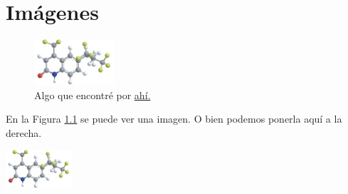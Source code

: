 \chapter{Imágenes}

\begin{figure}
\includegraphics[width=3cm]{imagen.jpg}  %
\caption{Algo que encontré por %
\href{http://www3.interscience.wiley.com/journal/13087/home/ForAuthors.html}{ahí.}%
}
\label{uno} 
\end{figure}

\begin{minipage}{8cm}
En la Figura \ref{uno} se puede ver una imagen. O bien podemos ponerla aquí a la derecha. 
\end{minipage} 
\hfill \begin{minipage}{3cm}
\includegraphics[width=2.5cm]{imagen.jpg}
\end{minipage}


